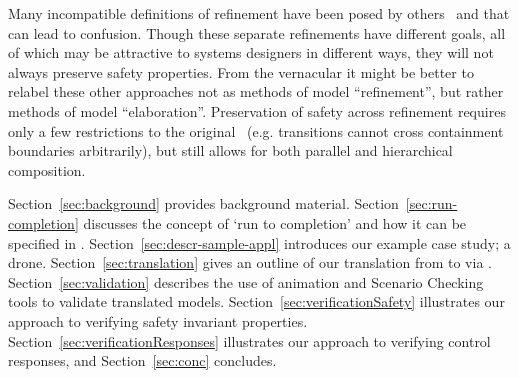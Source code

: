 Many incompatible definitions of refinement have been posed by others~\cite{Syriani_2019,Maraninchi91theargos} and that can lead to confusion.  
Though these separate refinements have different goals, all of which may be attractive to systems designers in different ways,
they will not always preserve safety properties.  
From the \EventB vernacular it might be better to relabel these other approaches not as methods of model ``refinement'', but rather methods of model ``elaboration''.  
Preservation of safety across refinement requires only a few restrictions to the original~\cite{Harel} \SCs (e.g. transitions cannot cross containment boundaries arbitrarily), but still allows for both parallel and hierarchical composition. 


Section~\ref{sec:background} provides background material. 
Section~\ref{sec:run-completion} discusses the \SC concept of `run to completion' and how it can be specified in \EventB. 
Section~\ref{sec:descr-sample-appl} introduces our example case study; a drone. 
Section~\ref{sec:translation} gives an outline of our translation from \SCXML to \EventB via \UMLB.
Section~\ref{sec:validation} describes the use of \UMLB animation and Scenario Checking tools to validate translated \SCXML models.
Section~\ref{sec:verificationSafety} illustrates our approach to verifying safety invariant properties. 
Section~\ref{sec:verificationResponses} illustrates our approach to verifying control responses, and 
Section~\ref{sec:conc} concludes.



